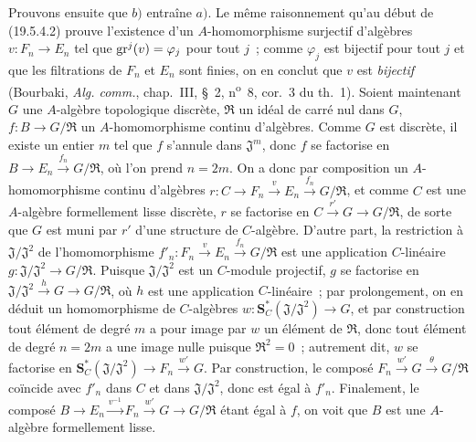\begin{env}[19.5.4.3]
\label{0.19.5.4.3-fr}
Prouvons ensuite que $b)$ entraîne $a)$. Le même raisonnement qu'au début de
(19.5.4.2) prouve l'existence d'un $A$-homomorphisme surjectif d'algèbres
$v:F_n\to E_n$ tel que $\operatorname{gr}^j(v)=\varphi_j$ pour tout $j$~; comme $\varphi_j$
est bijectif pour tout $j$ et que les filtrations de $F_n$ et $E_n$ sont
finies, on en conclut que $v$ est \emph{bijectif} (Bourbaki,
\emph{Alg. comm.}, chap.~III, §~2, n\textsuperscript{o}~8, cor.~3 du th.~1).
Soient maintenant $G$ une $A$-algèbre topologique discrète, $\mathfrak R$ un
idéal de carré nul dans $G$, $f:B\to G/\mathfrak R$ un $A$-homomorphisme
continu d'algèbres. Comme $G$ est discrète, il existe un entier $m$ tel que
$f$ s'annule dans $\mathfrak J^m$, donc $f$ se factorise en
$B\to E_n\xrightarrow{f_n}G/\mathfrak R$, où l'on prend $n=2m$. On a donc par
composition un $A$-homomorphisme continu d'algèbres
$r:C\to F_n\xrightarrow{v}E_n\xrightarrow{f_n}G/\mathfrak R$, et comme $C$
est une $A$-algèbre formellement lisse discrète, $r$ se factorise en
$C\xrightarrow{r'}G\to G/\mathfrak R$, de sorte que $G$ est muni par $r'$ d'une
structure de $C$-algèbre. D'autre part, la restriction à
$\mathfrak J/\mathfrak J^2$ de l'homomorphisme
$f'_n:F_n\xrightarrow{v}E_n\xrightarrow{f_n}G/\mathfrak R$ est une application
$C$-linéaire $g:\mathfrak J/\mathfrak J^2\to G/\mathfrak R$. Puisque
$\mathfrak J/\mathfrak J^2$ est un $C$-module projectif, $g$ se factorise en
$\mathfrak J/\mathfrak J^2\xrightarrow{h}G\to G/\mathfrak R$, où $h$ est une
application $C$-linéaire~; par prolongement, on en déduit un homomorphisme de
$C$-algèbres $w:\mathbf S_C^*(\mathfrak J/\mathfrak J^2)\to G$, et par
construction tout élément de degré $m$ a pour image par $w$ un élément de
$\mathfrak R$, donc tout élément de degré $n=2m$ a une image nulle puisque
$\mathfrak R^2=0$~; autrement dit, $w$ se factorise en
$\mathbf S_C^*(\mathfrak J/\mathfrak J^2)\to F_n\xrightarrow{w'}G$. Par
construction, le composé $F_n\xrightarrow{w'}G\xrightarrow{\theta}G/\mathfrak R$
coïncide avec $f'_n$ dans $C$ et dans $\mathfrak J/\mathfrak J^2$, donc est
égal à $f'_n$. Finalement, le composé
$B\to E_n\xrightarrow{v^{-1}}F_n\xrightarrow{w'}G\to G/\mathfrak R$ étant
égal à $f$, on voit que $B$ est une $A$-algèbre formellement lisse.
\end{env}

